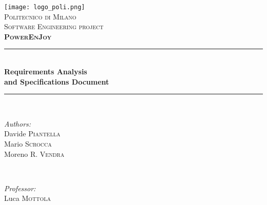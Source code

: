 \begin{titlepage}
\newcommand{\HRule}{\rule{\linewidth}{0.5mm}} %

\center %
 
\texttt{[image: logo\_poli.png]}\\[0.5cm] %
\textsc{\LARGE Politecnico di Milano}\\[2cm] %
\textsc{\Large Software Engineering  project}\\[0.5cm] %
\textsc{\large \textbf{PowerEnJoy}}\\[1.5cm] %


\HRule \\[0.4cm]
{ \huge \bfseries Requirements Analysis\\ and Specifications Document}\\[0.4cm] %
\HRule \\[1.5cm]
 

\begin{minipage}{0.4\textwidth}
\begin{flushleft} \large
\emph{Authors:}\\
Davide \textsc{Piantella}\\
Mario \textsc{Scrocca}\\
Moreno R. \textsc{Vendra} %
\end{flushleft}
\end{minipage}
~
\begin{minipage}{0.4\textwidth}
\begin{flushright} \large
\emph{Professor:} \\
Luca \textsc{Mottola} %
\end{flushright}
\end{minipage}\\[2cm]


\end{titlepage}
